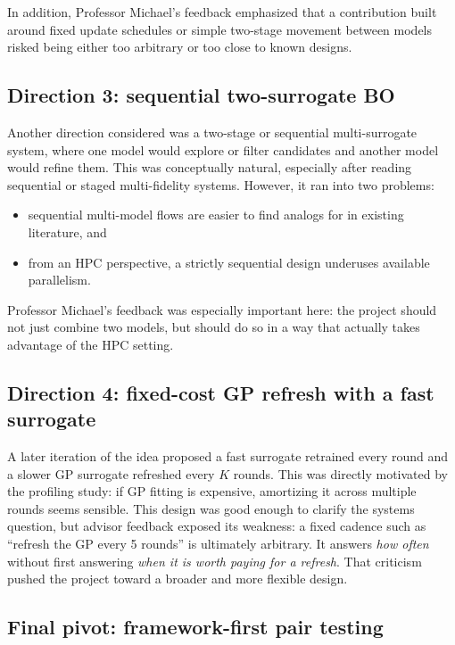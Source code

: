 \documentclass[11pt]{article}
\begin{document}
In addition, Professor Michael's feedback emphasized that a contribution built around fixed update schedules or simple two-stage movement between models risked being either too arbitrary or too close to known designs.

\subsection{Direction 3: sequential two-surrogate BO}

Another direction considered was a two-stage or sequential multi-surrogate system, where one model would explore or filter candidates and another model would refine them. This was conceptually natural, especially after reading sequential or staged multi-fidelity systems. However, it ran into two problems:
\begin{itemize}[leftmargin=1.5em]
    \item sequential multi-model flows are easier to find analogs for in existing literature, and
    \item from an HPC perspective, a strictly sequential design underuses available parallelism.
\end{itemize}

Professor Michael's feedback was especially important here: the project should not just combine two models, but should do so in a way that actually takes advantage of the HPC setting.

\subsection{Direction 4: fixed-cost GP refresh with a fast surrogate}

A later iteration of the idea proposed a fast surrogate retrained every round and a slower GP surrogate refreshed every $K$ rounds. This was directly motivated by the profiling study: if GP fitting is expensive, amortizing it across multiple rounds seems sensible. This design was good enough to clarify the systems question, but advisor feedback exposed its weakness: a fixed cadence such as ``refresh the GP every 5 rounds'' is ultimately arbitrary. It answers \emph{how often} without first answering \emph{when it is worth paying for a refresh}. That criticism pushed the project toward a broader and more flexible design.

\subsection{Final pivot: framework-first pair testing}
\end{document}
